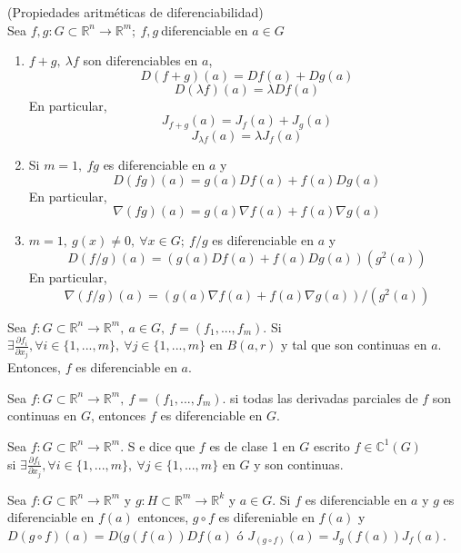 \begin{prop}(Propiedades aritméticas de diferenciabilidad)\\
Sea $f,g:G\subset \mathbb{R}^n \rightarrow \mathbb{R}^m; \ f,g \ $diferenciable en $a\in G$
\begin{enumerate}[label=(\roman*)]
    \item $f+g, \ \lambda f$ son diferenciables en $a$, \[D(f+g)(a) = Df(a) + Dg(a)\] \[D(\lambda f)(a) = \lambda Df(a)\] En particular, \[J_{f+g}(a) = J_f(a) + J_g(a)\]  \[ J_{\lambda f}(a) = \lambda J_f(a)\]
    \item Si $m=1, \ fg$ es diferenciable en $a$ y \[D(fg)(a) = g(a)Df(a) + f(a)Dg(a)\] En particular, \[\nabla (fg)(a) = g(a)\nabla f(a) + f(a)\nabla g(a)\]
    \item $m = 1, \ g(x) \neq 0, \ \forall x\in G; \ f/g$ es diferenciable en $a$ y \[D(f/g)(a) = (g(a)Df(a) + f(a)Dg(a))(g^2(a))\] En particular, \[\nabla(f/g)(a) = (g(a)\nabla f(a) + f(a)\nabla g(a))/(g^2(a))\]
\end{enumerate}
\end{prop}

\begin{theo}
Sea $f:G\subset \mathbb{R}^n \rightarrow \mathbb{R}^m, \ a \in G, \ f = (f_1,...,f_m)$. Si $\exists  \frac{\partial f_i}{\partial x_j}, \forall i\in\{1,...,m\}, \ \forall j\in\{1,...,m\}$ en $B(a,r)$ y tal que son continuas en $a$. Entonces, $f$ es diferenciable en $a$.
\end{theo}

\begin{cor}
Sea $f:G\subset \mathbb{R}^n \rightarrow \mathbb{R}^m, \ f = (f_1,...,f_m)$. si todas las derivadas parciales de $f$ son continuas en $G$, entonces $f$ es diferenciable en $G$. 
\end{cor}

\begin{defn}
Sea $f:G\subset \mathbb{R}^n \rightarrow \mathbb{R}^m$. S e dice que $f$ es de clase 1 en $G$ escrito $f\in \mathbb{C}^1(G)$ \\ si $\exists  \frac{\partial f_i}{\partial x_j}, \forall i\in\{1,...,m\}, \ \forall j\in\{1,...,m\}$ en $G$ y son continuas.
\end{defn}

\begin{theo}
Sea $f:G\subset \mathbb{R}^n \rightarrow \mathbb{R}^m$ y $g:H\subset \mathbb{R}^m \rightarrow \mathbb{R}^k$ y $a\in G$. Si $f$ es diferenciable en $a$ y $g$ es diferenciable en $f(a)$ entonces, $ g \circ f$ es difereniable en $f(a)$ y $D(g\circ f)(a) = D(g(f(a))Df(a)$ ó $J_{(g\circ f)}(a) = J_g(f(a))J_f(a)$.
\end{theo}

